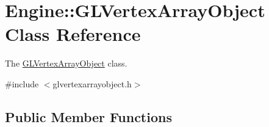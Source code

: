 \hypertarget{classEngine_1_1GLVertexArrayObject}{}\section{Engine\+:\+:G\+L\+Vertex\+Array\+Object Class Reference}
\label{classEngine_1_1GLVertexArrayObject}


The \hyperlink{classEngine_1_1GLVertexArrayObject}{G\+L\+Vertex\+Array\+Object} class.  




{\ttfamily \#include $<$glvertexarrayobject.\+h$>$}

\subsection*{Public Member Functions}
